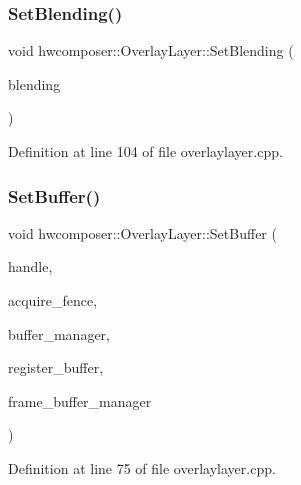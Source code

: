 \subsubsection{\texorpdfstring{Set\+Blending()}{SetBlending()}}
{\footnotesize\ttfamily void hwcomposer\+::\+Overlay\+Layer\+::\+Set\+Blending (\begin{DoxyParamCaption}\item[{H\+W\+C\+Blending}]{blending }\end{DoxyParamCaption})}



Definition at line 104 of file overlaylayer.\+cpp.


\begin{DoxyCode}{0}
\end{DoxyCode}
\mbox{\label{structhwcomposer_1_1OverlayLayer_a48fe87ac79da0d09f4bc6de5057de445}} 
\subsubsection{\texorpdfstring{Set\+Buffer()}{SetBuffer()}}
{\footnotesize\ttfamily void hwcomposer\+::\+Overlay\+Layer\+::\+Set\+Buffer (\begin{DoxyParamCaption}\item[{\mbox{\hyperlink{alios_2platformdefines_8h_ac0a2eaf260f556d17fe489911f017bdf}{H\+W\+C\+Native\+Handle}}}]{handle,  }\item[{int32\+\_\+t}]{acquire\+\_\+fence,  }\item[{\mbox{\hyperlink{classhwcomposer_1_1ResourceManager}{Resource\+Manager}} $\ast$}]{buffer\+\_\+manager,  }\item[{bool}]{register\+\_\+buffer,  }\item[{\mbox{\hyperlink{classhwcomposer_1_1FrameBufferManager}{Frame\+Buffer\+Manager}} $\ast$}]{frame\+\_\+buffer\+\_\+manager }\end{DoxyParamCaption})}



Definition at line 75 of file overlaylayer.\+cpp.


